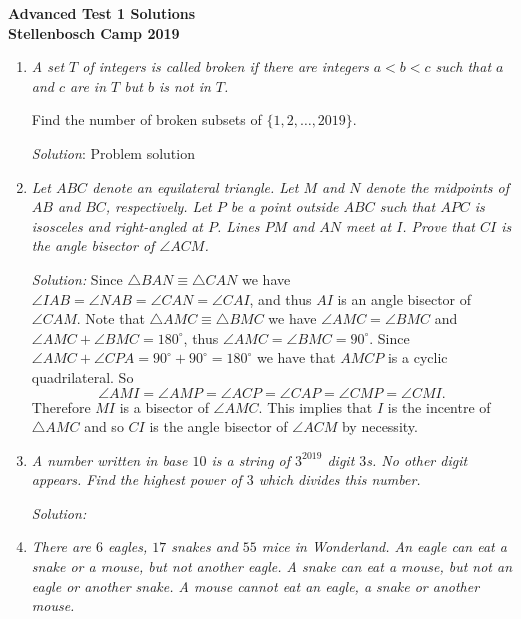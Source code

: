 \documentclass{article}
\begin{document}
\begin{center}
  \textbf{\Large Advanced Test 1 Solutions}
  \\ \vspace{1em}
  \textbf{\large Stellenbosch Camp 2019}
\end{center}


\begin{enumerate}[1.]

\item %
{\itshape
A set $T$ of integers is called \emph{broken} if there are integers $a < b < c$ such that $a$ and $c$ are in $T$ but $b$ is not in $T$.

Find the number of broken subsets of $\{1, 2, \dotsc, 2019\}$.}

\textit{Solution}:
Problem solution


\item %
{\itshape
Let $ABC$ denote an equilateral triangle.
Let $M$ and $N$ denote the midpoints of $AB$ and $BC$, respectively.
Let $P$ be a point outside $ABC$ such that $APC$ is isosceles and right-angled at $P$.
Lines $PM$ and $AN$ meet at $I$.
Prove that $CI$ is the angle bisector of $\angle ACM$.}

\textit{Solution:}
Since $\triangle BAN \equiv \triangle CAN$ we have $\angle IAB = \angle NAB = \angle CAN = \angle CAI $, and thus $AI$ is an angle bisector of $\angle CAM$. Note that $\triangle AMC \equiv \triangle BMC$ we have $\angle AMC = \angle BMC$ and $\angle AMC + \angle BMC =180^\circ$, thus $\angle AMC = \angle BMC = 90^\circ$. Since $\angle AMC + \angle CPA = 90^\circ +90^\circ =180^\circ$ we have that $AMCP$ is a cyclic quadrilateral. So
\[ \angle AMI = \angle AMP = \angle ACP = \angle CAP = \angle CMP = \angle CMI. \]
Therefore $MI$ is a bisector of $\angle AMC$. This implies that $I$ is the incentre of $\triangle AMC$ and so $CI$ is the angle bisector of $\angle ACM$ by necessity.


\item %
{\itshape
A number written in base $10$ is a string of $3^{2019}$ digit $3$s.
No other digit appears.
Find the highest power of $3$ which divides this number.}

\textit{Solution:}


\item %
{\itshape
There are $6$ eagles, $17$ snakes and $55$ mice in Wonderland.
An eagle can eat a snake or a mouse, but not another eagle.
A snake can eat a mouse, but not an eagle or another snake.
A mouse cannot eat an eagle, a snake or another mouse.

}
\end{enumerate}
\end{document}
